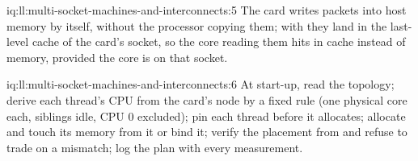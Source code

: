 \begin{solution}{iq:ll:multi-socket-machines-and-interconnects:5}
The card writes packets into host memory by itself, without the processor copying them; with  they
land in the last-level cache of the card's socket, so the core reading them hits in cache instead of memory, provided the
core is on that socket.
\end{solution}

\begin{solution}{iq:ll:multi-socket-machines-and-interconnects:6}
At start-up, read the topology; derive each thread's CPU from the card's node by a fixed rule (one physical core each,
siblings idle, CPU 0 excluded); pin each thread before it allocates; allocate and touch its memory from it or bind it;
verify the placement from  and refuse to trade on a mismatch; log the plan with every measurement.
\end{solution}
